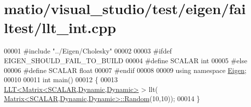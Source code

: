 \hypertarget{matio_2visual__studio_2test_2eigen_2failtest_2llt__int_8cpp_source}{}\section{matio/visual\+\_\+studio/test/eigen/failtest/llt\+\_\+int.cpp}
\label{matio_2visual__studio_2test_2eigen_2failtest_2llt__int_8cpp_source}

\begin{DoxyCode}
00001 \textcolor{preprocessor}{#include "../Eigen/Cholesky"}
00002 
00003 \textcolor{preprocessor}{#ifdef EIGEN\_SHOULD\_FAIL\_TO\_BUILD}
00004 \textcolor{preprocessor}{#define SCALAR int}
00005 \textcolor{preprocessor}{#else}
00006 \textcolor{preprocessor}{#define SCALAR float}
00007 \textcolor{preprocessor}{#endif}
00008 
00009 \textcolor{keyword}{using namespace }\hyperlink{namespace_eigen}{Eigen};
00010 
00011 \textcolor{keywordtype}{int} main()
00012 \{
00013   \hyperlink{group___cholesky___module_class_eigen_1_1_l_l_t}{LLT<Matrix<SCALAR,Dynamic,Dynamic>} > llt(
      \hyperlink{group___core___module_class_eigen_1_1_matrix}{Matrix<SCALAR,Dynamic,Dynamic>::Random}(10,10));
00014 \}
\end{DoxyCode}
